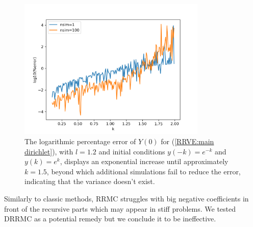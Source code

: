 \documentclass[a4paper,12pt]{article}
\begin{document}
\begin{figure}[h!]
    \centering
    \includegraphics[width=0.8\textwidth]{plots/mainD explosion.png}
    \caption{The logarithmic percentage error of $Y(0)$ for
    (\ref{RRVE:main dirichlet}), with $l=1.2$ and initial conditions
    $y(-k)=e^{-k}$ and $y(k)=e^{k}$, displays an exponential
    increase until approximately $k=1.5$, beyond which additional
    simulations fail to reduce the error, indicating that the variance
    doesn't exist.}
    \label{fig:mainD explosion}
\end{figure}



Similarly to classic methods, RRMC struggles with big negative coefficients in front
of the recursive parts which may appear in
stiff problems. We tested DRRMC as a potential remedy  but we conclude
it to be ineffective.
\end{document}
